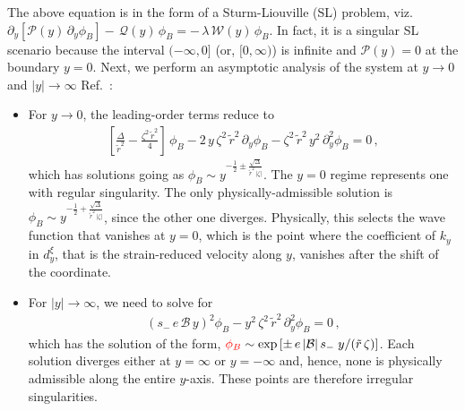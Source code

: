 \documentclass[aps,prb, onecolumn, nofootinbib, citeautoscript,10pt]{revtex4-2}
\newcommand{\red}[1]{{\color{red}#1}}
\def \nn{\nonumber \\}
\begin{document}
\begin{widetext}
The above \red{equation is} in the form of a Sturm-\red{Liouville (SL)} problem, viz. $\partial_y \left[ \mathcal P (y)\,\partial_y \phi_B \right ] - \, {\mathcal Q} (y)\,\phi_B = -\,\lambda\, {\mathcal W}(y)\,\phi_B $. In fact, it is a singular \red{SL} scenario because the interval $(-\infty, 0]$ (or, $ [0, \infty)$) \red{is }infinite and ${\mathcal P} (y) = 0$ at the boundary $y= 0$. Next, we perform an asymptotic analysis of the system at $y\rightarrow0$ and $ |y| \rightarrow \infty$ Ref.~\cite{strained-dirac-franz}:
\begin{itemize}
\item For $y\rightarrow0$, the leading-order terms reduce to
\begin{align}
\left[\frac{\Delta}{\tilde{r}^2}-\frac{\zeta^2\,\tilde{r}^2}{4} \right] \, \phi_B 
-2 \,y \, \zeta^2 \, \tilde{r}^2  \, \partial_y \phi_B- \zeta^2 \, \tilde{r}^2 \,y^2 \, \partial^2_y \phi_B=0 \,,
\end{align}
which has solutions going as $\phi_B \sim y^{-\frac{1}{2}\pm{\frac{\sqrt{\Delta}}{\tilde{r}^2 \, |\zeta|}}} $. The $y=0$ regime represents one with regular singularity. The only physically-admissible solution is  $ \phi_B \sim y^{-\frac{1}{2}+{\frac{\sqrt{\Delta}}{\tilde{r}^2 \, |\zeta|}}} $, since the other one diverges. Physically, this selects the wave function that vanishes at $y=0$, which is the point where the coefficient of $k_y$ in $d^\xi_y$, that is the strain-reduced velocity along $y$, vanishes after the shift of the coordinate. 

\item For $ |y| \rightarrow\infty$, we need to solve for
\begin{align}
\left (s_{-}\,e \, {\mathcal B}\,y \right )^2  \phi_B -y^2 \,\zeta^2 \, \tilde{r}^2 \, \partial^2_y \phi_B=0 \, ,
\end{align}
which has the solution of the form, $ \red{\phi_B} \sim \exp \left [ {\pm \, e\, |{\mathcal B}|  \,s_- \; y} /(\tilde r \, \zeta) \right ] $. 
Each solution diverges either at $ y = \infty$ or $y=-\infty $ and, hence, none is physically admissible along the entire $y$-axis. These points are therefore irregular singularities.


\end{itemize}
\end{widetext}
\end{document}
